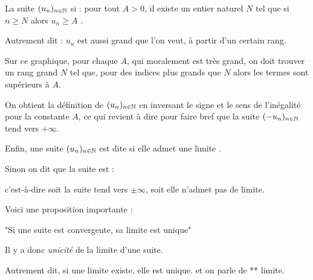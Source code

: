 \diapo

La suite $(u_n)_{n\in \mathbb{N}}$  si :
pour tout $A >0$, il existe un entier naturel $N$ tel que si $n\geq N$ alors $u_n\geq A$ . 

Autrement dit : $u_n$ est aussi grand que l'on veut, à partir d'un certain rang.

\change

Sur ce graphique, pour chaque $A$, qui moralement est très grand,
on doit trouver un rang grand $N$ tel que, pour des indices plus grands 
que $N$ alors les termes sont supérieurs à $A$.

\change

On obtient la définition de $(u_n)_{n\in \mathbb{N}}$ 
 en inversant le signe et le sens 
de l'inégalité pour la constante $A$, 
ce qui revient à dire pour faire bref que la suite $(-u_n)_{n\in \mathbb{N}}$ tend vers $+\infty$.


\diapo

Enfin, une suite $(u_n)_{n\in \mathbb{N}}$ est dite  
si elle admet une limite .

Sinon on dit que la suite est  :

c'est-à-dire soit la suite tend vers $\pm \infty$, soit elle n'admet pas de limite.

\change

Voici une proposition importante :

"Si une suite est convergente, sa limite est unique"

Il y a donc \emph{unicité} de la limite d'une suite.


Autrement dit, si une limite existe, elle est unique.
et on parle de ** limite.
% 
% 
% 
%  
% 
% 
% 
% 
% 
% 
% 
% 
% 
% 
% 
% 
% 
% 

